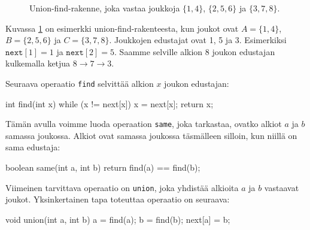 \begin{figure}
\center
\begin{center}
\end{center}
\caption{Union-find-rakenne, joka vastaa joukkoja $\{1,4\}$, $\{2,5,6\}$ ja $\{3,7,8\}$.}
\label{fig:unifin}
\end{figure}

Kuvassa \ref{fig:unifin} on esimerkki union-find-rakenteesta, kun joukot ovat
$A=\{1,4\}$, $B=\{2,5,6\}$ ja $C=\{3,7,8\}$.
Joukkojen edustajat ovat 1, 5 ja 3.
Esimerkiksi $\texttt{next}[1]=1$ ja $\texttt{next}[2]=5$.
Saamme selville alkion 8 joukon edustajan kulkemalla ketjua
$8 \rightarrow 7 \rightarrow 3$.

Seuraava operaatio \texttt{find} selvittää alkion $x$ joukon edustajan:

\begin{code}
int find(int x) {
    while (x != next[x]) {
        x = next[x];
    }
    return x;
}
\end{code}

Tämän avulla voimme luoda operaation \texttt{same}, joka tarkastaa,
ovatko alkiot $a$ ja $b$ samassa joukossa.
Alkiot ovat samassa joukossa täsmälleen silloin, kun niillä
on sama edustaja:

\begin{code}
boolean same(int a, int b) {
    return find(a) == find(b);
}
\end{code}

Viimeinen tarvittava operaatio on \texttt{union}, joka yhdistää alkioita
$a$ ja $b$ vastaavat joukot.
Yksinkertainen tapa toteuttaa operaatio on seuraava:

\begin{code}
void union(int a, int b) {
    a = find(a);
    b = find(b);
    next[a] = b;
}
\end{code}

